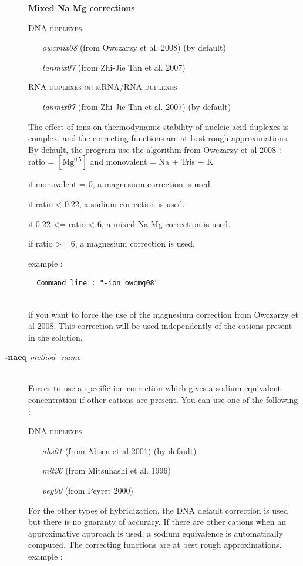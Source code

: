 \documentclass{article}
\begin{document}
\begin{description}
  \textbf{Mixed Na Mg corrections}
  
    \textsc{DNA duplexes}
      \begin{itemize}
      \item [\textit{owcmix08}] (from Owczarzy et al. 2008)  (by default)
      \item [\textit{tanmix07}] (from Zhi-Jie Tan et al. 2007)	 	  
      \end{itemize}
    \textsc{RNA duplexes or mRNA/RNA duplexes}
      \begin{itemize}
      \item [\textit{tanmix07}] (from Zhi-Jie Tan et al. 2007)  (by default)
      \end{itemize}
  The effect of ions on  thermodynamic  stability  of nucleic  acid duplexes is complex, and the correcting 
  functions are  at  best rough  approximations.
  By default, the program use the algorithm from Owczarzy et al 2008 : ratio =
  $[\mbox{Mg}^{0.5}]$ and monovalent = Na + Tris + K
  
  if monovalent = 0, a magnesium correction is used.
  
  if ratio < 0.22, a sodium correction is used.
  
  if 0.22 <= ratio < 6, a mixed Na Mg correction is used.
  
  if ratio >= 6, a magnesium correction is used.
  
  example :
  
  \begin{verbatim}
  Command line : "-ion owcmg08" 
  
  \end{verbatim}
  if you want to force the use of the magnesium correction from Owczarzy et al 2008. This correction will be used 
  independently of the cations present in the solution.
\item [\textbf{-naeq} \textit{method\_name}]\mbox{}\\ 
  Forces to use a specific ion correction which gives a sodium equivalent concentration if other cations are present.
  You can use one of the following :
  
  \textsc{DNA duplexes}
    \begin{itemize}
    \item [\textit{ahs01}] (from Ahsen et al 2001)  (by default)
    \item [\textit{mit96}] (from Mitsuhashi et al. 1996)
    \item [\textit{pey00}] (from Peyret 2000)		 
    \end{itemize}
  For the other types of hybridization, the DNA default correction is used but there is no guaranty of accuracy.
  If there are other cations when an approximative approach is used, a sodium equivalence is automatically computed.
  The correcting functions are  at  best rough  approximations.
  example :
  

\end{description}
\end{document}
